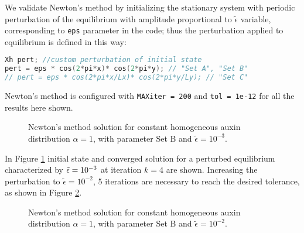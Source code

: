 We validate Newton's method by initializing the stationary system with periodic perturbation of the equilibrium with amplitude proportional to $\tilde{\epsilon}$ variable, corresponding to \verb|eps| parameter in the code; thus the perturbation applied to equilibrium is defined in this way:
\begin{lstlisting}[firstnumber = 24, language = C++, caption = 1cell\_stationaryTest.edp: perturbation of the equilibrium]
Xh pert; //custom perturbation of initial state
pert = eps * cos(2*pi*x)* cos(2*pi*y); // "Set A", "Set B"
// pert = eps * cos(2*pi*x/Lx)* cos(2*pi*y/Ly); // "Set C"
\end{lstlisting}

Newton's method is configured with \verb|MAXiter = 200| and \verb|tol = 1e-12| for all the results here shown.
\begin{figure}[H]
    \centering
    \quad
    \caption[Validation of theoretical equilibrium - $\tilde{\epsilon} = 10^{-3}$ ]{Newton's method solution for constant homogeneous auxin distribution $\alpha = 1$, with parameter Set B and $\tilde{\epsilon} = 10^{-3}$.}
    \label{fig:Uhom_1e-3}
\end{figure}
In Figure \ref{fig:Uhom_1e-3} initial state and converged solution for a perturbed equilibrium characterized by $\Tilde{\epsilon} = 10^{-3}$ at iteration $k = 4$ are shown.
Increasing the perturbation to $\tilde{\epsilon} = 10^{-2}$, 5 iterations are necessary to reach the desired tolerance, as shown in Figure \ref{fig:Uhom_1e-2}.
\begin{figure}[h]
    \centering
    \quad
    \caption[Validation of theoretical equilibrium - $\tilde{\epsilon} = 10^{-2}$ ]{Newton's method solution for constant homogeneous auxin distribution $\alpha = 1$, with parameter Set B and $\tilde{\epsilon} = 10^{-2}$.}
    \label{fig:Uhom_1e-2}
\end{figure}
